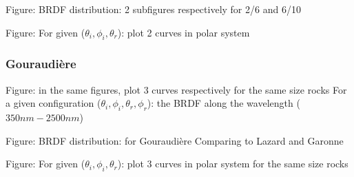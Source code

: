 Figure:
BRDF distribution: 2 subfigures respectively for 2/6 and 6/10

Figure:
For given ($\theta_i, \phi_i, \theta_r$): plot 2 curves in polar system

\subsubsection{Gouraudière}

Figure: in the same figures, plot 3 curves respectively for the same size rocks
For a given configuration ($\theta_i, \phi_i, \theta_r, \phi_r$): the BRDF along the wavelength ($350nm - 2500nm$)

Figure:
BRDF distribution: for Gouraudière
Comparing to Lazard and Garonne

Figure:
For given ($\theta_i, \phi_i, \theta_r$): plot 3 curves in polar system for the same size rocks






